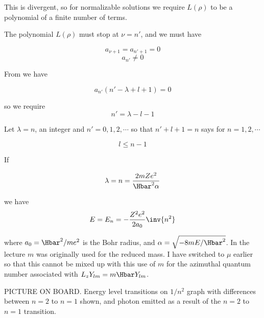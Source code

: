 This is divergent, so for normalizable solutions we require \(L(\rho)\) to be a polynomial of a finite number of terms.

The polynomial \(L(\rho)\) must stop at \(\nu = n'\), and we must have

\begin{equation}\label{eqn:PHY356FLecture10:260}
a_{\nu+1} = a_{n' +1} = 0
\end{equation}
\begin{equation}\label{eqn:PHY356FLecture10:270}
a_{n'} \ne 0
\end{equation}

From  we have

\begin{equation}\label{eqn:PHY356FLecture10:200a}
a_{n'} \left(
n' - \lambda + l + 1
\right)
=0
\end{equation}

so we require
\begin{equation}\label{eqn:PHY356FLecture10:280}
n' = \lambda - l - 1
\end{equation}

Let \(\lambda = n\), an integer and \(n' = 0, 1, 2, \cdots\) so that \(n' + l + 1 = n\) says for \(n= 1,2, \cdots\)

\begin{equation}\label{eqn:PHY356FLecture10:290}
l \le n-1
\end{equation}

If

\begin{equation}\label{eqn:PHY356FLecture10:300}
\lambda = n = \frac{2 m Z e^2 }{\Hbar^2 \alpha}
\end{equation}

we have
\begin{equation}\label{eqn:PHY356FLecture10:310}
E = E_n = - \frac{Z^2 e^2 }{2 a_0} \inv{n^2}
\end{equation}

where \(a_0 = \Hbar^2/m e^2\) is the Bohr radius, and \(\alpha = \sqrt{-8 m E/\Hbar^2}\).  In the lecture \(m\) was originally used for the reduced mass.  I have switched to \(\mu\) earlier so that this cannot be mixed up with this use of \(m\) for the azimuthal quantum number associated with \(L_z Y_{lm} = m \Hbar Y_{lm}\).

PICTURE ON BOARD.  Energy level transitions on \(1/n^2\) graph with differences between \(n=2\) to \(n=1\) shown, and photon emitted as a result of the \(n=2\) to \(n=1\) transition.

